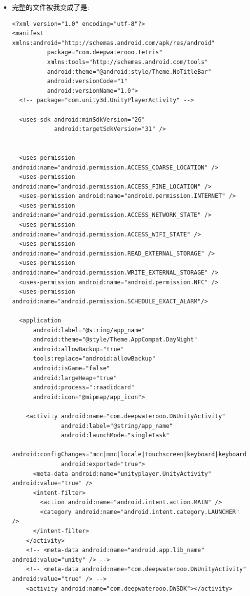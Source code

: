\documentclass[9pt, b5paper]{article}
\begin{document}
\begin{itemize}
\item 完整的文件被我变成了是:
\begin{verbatim}
<?xml version="1.0" encoding="utf-8"?>
<manifest xmlns:android="http://schemas.android.com/apk/res/android"
          package="com.deepwaterooo.tetris"
          xmlns:tools="http://schemas.android.com/tools"
          android:theme="@android:style/Theme.NoTitleBar"
          android:versionCode="1"
          android:versionName="1.0">
  <!-- package="com.unity3d.UnityPlayerActivity" -->

  <uses-sdk android:minSdkVersion="26"
            android:targetSdkVersion="31" />

  
  <uses-permission android:name="android.permission.ACCESS_COARSE_LOCATION" />
  <uses-permission android:name="android.permission.ACCESS_FINE_LOCATION" />
  <uses-permission android:name="android.permission.INTERNET" />
  <uses-permission android:name="android.permission.ACCESS_NETWORK_STATE" />
  <uses-permission android:name="android.permission.ACCESS_WIFI_STATE" />
  <uses-permission android:name="android.permission.READ_EXTERNAL_STORAGE" />
  <uses-permission android:name="android.permission.WRITE_EXTERNAL_STORAGE" />
  <uses-permission android:name="android.permission.NFC" />
  <uses-permission android:name="android.permission.SCHEDULE_EXACT_ALARM"/>  

  <application
      android:label="@string/app_name"
      android:theme="@style/Theme.AppCompat.DayNight"
      android:allowBackup="true"
      tools:replace="android:allowBackup"
      android:isGame="false"
      android:largeHeap="true"
      android:process=":raadidcard"
      android:icon="@mipmap/app_icon">

    <activity android:name="com.deepwaterooo.DWUnityActivity"
              android:label="@string/app_name"
              android:launchMode="singleTask"
              android:configChanges="mcc|mnc|locale|touchscreen|keyboard|keyboardHidden|navigation|orientation|screenLayout|uiMode|screenSize|smallestScreenSize|fontScale"
              android:exported="true">
      <meta-data android:name="unityplayer.UnityActivity" android:value="true" />
      <intent-filter>
        <action android:name="android.intent.action.MAIN" />
        <category android:name="android.intent.category.LAUNCHER" />
      </intent-filter>
    </activity>
    <!-- <meta-data android:name="android.app.lib_name" android:value="unity" /> -->
    <!-- <meta-data android:name="com.deepwaterooo.DWUnityActivity" android:value="true" /> -->
    <activity android:name="com.deepwaterooo.DWSDK"></activity>


\end{verbatim}
\end{itemize}
\end{document}
